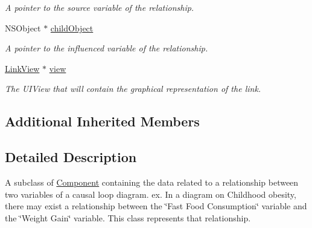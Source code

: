 \begin{DoxyCompactItemize}
\begin{DoxyCompactList}\small\item\em A pointer to the source variable of the relationship. \end{DoxyCompactList}\item 
\hypertarget{interface_relationship_af4c244bdb8aff91ef4e8c7c3d3761d8e}{N\-S\-Object $\ast$ \hyperlink{interface_relationship_af4c244bdb8aff91ef4e8c7c3d3761d8e}{child\-Object}}\label{interface_relationship_af4c244bdb8aff91ef4e8c7c3d3761d8e}

\begin{DoxyCompactList}\small\item\em A pointer to the influenced variable of the relationship. \end{DoxyCompactList}\item 
\hypertarget{interface_relationship_a3cfc9e00758de3dfcb469a1dab530bcf}{\hyperlink{interface_link_view}{Link\-View} $\ast$ \hyperlink{interface_relationship_a3cfc9e00758de3dfcb469a1dab530bcf}{view}}\label{interface_relationship_a3cfc9e00758de3dfcb469a1dab530bcf}

\begin{DoxyCompactList}\small\item\em The U\-I\-View that will contain the graphical representation of the link. \end{DoxyCompactList}\end{DoxyCompactItemize}
\subsection*{Additional Inherited Members}


\subsection{Detailed Description}
A subclass of \hyperlink{interface_component}{Component} containing the data related to a relationship between two variables of a causal loop diagram. ex. In a diagram on Childhood obesity, there may exist a relationship between the \char`\"{}\-Fast Food Consumption\char`\"{} variable and the \char`\"{}\-Weight Gain\char`\"{} variable. This class represents that relationship. 

